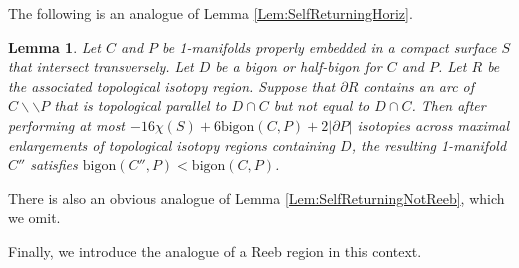 \documentclass[oneside]{amsart}
\numberwithin{equation}{section}
\theoremstyle{plain}
\newtheorem{lemma}[equation]{Lemma}
\theoremstyle{definition}
\newcommand{\cut}{\backslash\backslash}
\begin{document}
The following is an analogue of Lemma \ref{Lem:SelfReturningHoriz}.

\begin{lemma}
\label{Lem:SelfReturningHorizBigon}
Let $C$ and $P$ be 1-manifolds properly embedded in a compact surface $S$ that intersect transversely. Let $D$ be a bigon or half-bigon for $C$ and $P$. Let $R$ be the associated topological isotopy region. Suppose that $\partial R$ contains an arc of $C \cut P$ that is topological parallel to $D \cap C$ but not equal to $D \cap C$. Then after performing at most $-16\chi(S) + 6 \mathrm{bigon}(C,P) + 2 |\partial P|$ isotopies across maximal enlargements of topological isotopy regions containing $D$, the resulting 1-manifold $C''$ satisfies ${\mathrm{bigon}}(C'', P) < {\mathrm{bigon}}(C,P)$.
\end{lemma}

There is also an obvious analogue of Lemma \ref{Lem:SelfReturningNotReeb}, which we omit.

Finally, we introduce the analogue of a Reeb region in this context.
\end{document}
